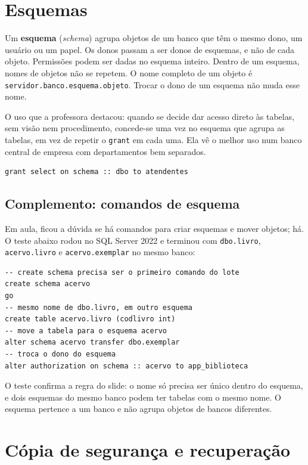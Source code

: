 \section{Esquemas}

Um \textbf{esquema} (\emph{schema}) agrupa
objetos de um banco que têm o mesmo dono, um usuário ou um papel. Os
donos passam a ser donos de esquemas, e não de cada objeto. Permissões
podem ser dadas no esquema inteiro. Dentro de um esquema, nomes de
objetos não se repetem. O nome completo de um objeto é
\texttt{servidor.banco.esquema.objeto}. Trocar o dono de um esquema não
muda esse nome.

O uso que a professora destacou: quando se decide dar acesso direto às
tabelas, sem visão nem procedimento, concede-se uma vez no esquema que
agrupa as tabelas, em vez de repetir o \texttt{grant} em cada uma. Ela
vê o melhor uso num banco central de empresa com departamentos bem
separados.

\begin{lstlisting}
grant select on schema :: dbo to atendentes
\end{lstlisting}

\subsection*{Complemento: comandos de esquema}

Em aula, ficou a dúvida se há comandos para criar esquemas e mover
objetos; há. O teste abaixo rodou no SQL Server 2022 e terminou com
\texttt{dbo.livro}, \texttt{acervo.livro} e \texttt{acervo.exemplar}
no mesmo banco:

\begin{lstlisting}
-- create schema precisa ser o primeiro comando do lote
create schema acervo
go
-- mesmo nome de dbo.livro, em outro esquema
create table acervo.livro (codlivro int)
-- move a tabela para o esquema acervo
alter schema acervo transfer dbo.exemplar
-- troca o dono do esquema
alter authorization on schema :: acervo to app_biblioteca
\end{lstlisting}

O teste confirma a regra do slide: o nome só precisa ser único dentro
do esquema, e dois esquemas do mesmo banco podem ter tabelas com o mesmo
nome. O esquema pertence a um banco e não agrupa objetos de bancos
diferentes.

\section{Cópia de segurança e recuperação}

